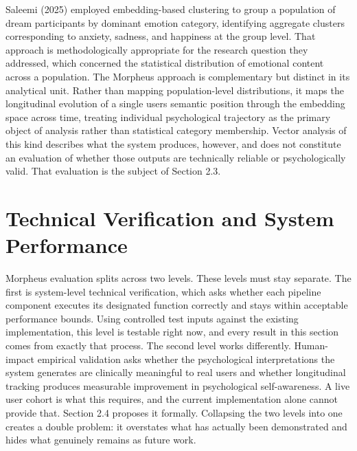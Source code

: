 \documentclass[12pt,a4paper]{report}
\begin{document}
Saleemi (2025) employed embedding-based clustering to group a population of dream participants by dominant emotion category, identifying aggregate clusters corresponding to anxiety, sadness, and happiness at the group level. That approach is methodologically appropriate for the research question they addressed, which concerned the statistical distribution of emotional content across a population. The Morpheus approach is complementary but distinct in its analytical unit. Rather than mapping population-level distributions, it maps the longitudinal evolution of a single user\textquotesingle{}s semantic position through the embedding space across time, treating individual psychological trajectory as the primary object of analysis rather than statistical category membership. Vector analysis of this kind describes what the system produces, however, and does not constitute an evaluation of whether those outputs are technically reliable or psychologically valid. That evaluation is the subject of Section 2.3.

\section{Technical Verification and System Performance}
Morpheus evaluation splits across two levels. These levels must stay separate. The first is system-level technical verification, which asks whether each pipeline component executes its designated function correctly and stays within acceptable performance bounds. Using controlled test inputs against the existing implementation, this level is testable right now, and every result in this section comes from exactly that process. The second level works differently. Human-impact empirical validation asks whether the psychological interpretations the system generates are clinically meaningful to real users and whether longitudinal tracking produces measurable improvement in psychological self-awareness. A live user cohort is what this requires, and the current implementation alone cannot provide that. Section 2.4 proposes it formally. Collapsing the two levels into one creates a double problem: it overstates what has actually been demonstrated and hides what genuinely remains as future work.
\end{document}
